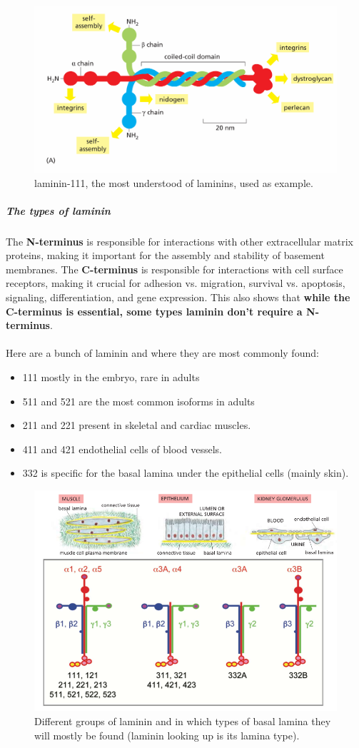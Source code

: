 \documentclass[../main.tex]{subfiles}
\begin{document}
\begin{figure}[H]
	\centering
	\includegraphics[width=0.7\linewidth]{bl_111}
	\caption{laminin-111, the most understood of laminins, used as example.}
	\label{fig:bl111}
\end{figure}


\subparagraph{The types of laminin}

The \textbf{N-terminus} is responsible for interactions with other extracellular matrix proteins, making it important for the assembly and stability of basement membranes. The \textbf{C-terminus} is responsible for interactions with cell surface receptors, making it crucial for adhesion vs. migration, survival vs. apoptosis, signaling, differentiation, and gene expression. This also shows that \textbf{while the C-terminus is essential, some types laminin don't require a N-terminus}.\\
\\
Here are a bunch of laminin and where they are most commonly found:
\begin{itemize}
	\item 111 mostly in the embryo, rare in adults
	\item 511 and 521 are the most common isoforms in adults
	\item 211 and 221 present in skeletal and cardiac muscles.
	\item 411 and 421 endothelial cells of blood vessels.
	\item 332 is specific for the basal lamina under the epithelial cells (mainly skin).
\end{itemize}

\begin{figure}[H]
	\centering
	\includegraphics[width=0.6\linewidth]{bl_type}
	\caption{Different groups of laminin and in which types of basal lamina they will mostly be found (laminin looking up is its lamina type).}
	\label{fig:bltype}
\end{figure}


\printglossaries
\end{document}

